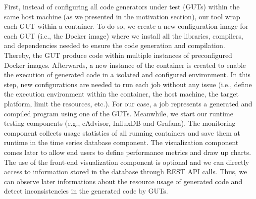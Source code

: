 First, instead of configuring all code generators under test (GUTs) within the same host machine (as we presented in the motivation section), our tool wrap each GUT within a container. To do so, we create a new configuration image for each GUT (i.e., the Docker image) where we install all the libraries, compilers, and dependencies needed to ensure the code generation and compilation. Thereby, the GUT produce code within multiple instances of preconfigured Docker images. Afterwards, a new instance of the container is created to enable the execution of generated code in a isolated and configured environment. In this step, new configurations are needed to run each job without any issue (i.e., define the execution environment within the container, the host machine, the target platform, limit the resources, etc.). For our case, a job represents a generated and compiled program using one of the GUTs. Meanwhile, we start our runtime testing components (e.g., cAdvisor, InfluxDB and Grafana). The monitoring component collects usage statistics of all running containers and save them at runtime in the time series database component. The visualization component comes later to allow end users to define performance metrics and draw up charts. The use of the front-end visualization component is optional and we can directly access to information stored in the database through REST API calls. Thus, we can observe later informations about the resource usage of generated code and detect inconsistencies in the generated code by GUTs. 


